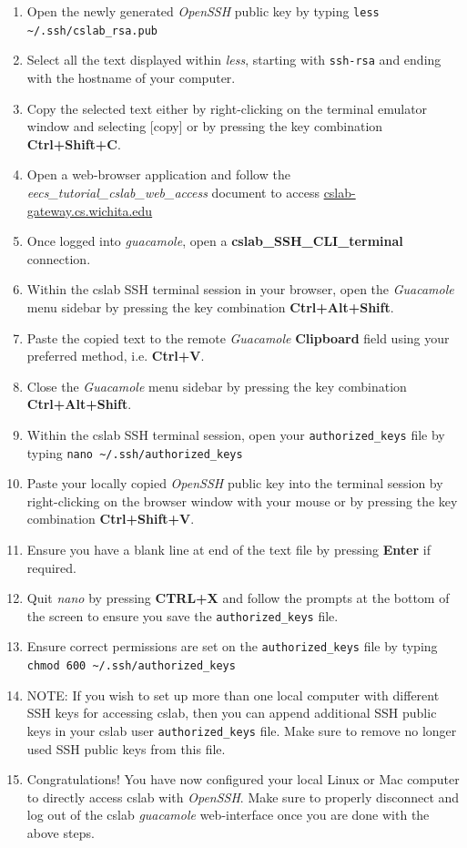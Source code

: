 \documentclass[12pt]{article}
\begin{document}
\begin{flushleft}
\begin{enumerate}
  \item Open the newly generated \textit{OpenSSH} public key by typing \break
    \verb|less ~/.ssh/cslab_rsa.pub|
  \item Select all the text displayed within \textit{less}, starting with \texttt{ssh-rsa} and ending with the hostname of your computer.
  \item Copy the selected text either by right-clicking on the terminal emulator window and selecting [copy] or by pressing the key combination \textbf{Ctrl+Shift+C}.
  \item Open a web-browser application and follow the \textit{eecs\_tutorial\_cslab\_web\_access} document to access \href{https://cslab-gateway.cs.wichita.edu/}{cslab-gateway.cs.wichita.edu}
  \item Once logged into \textit{guacamole}, open a \textbf{cslab\_SSH\_CLI\_terminal} connection.
  \item Within the cslab SSH terminal session in your browser, open the \textit{Guacamole} menu sidebar by pressing the key combination \textbf{Ctrl+Alt+Shift}.
  \item Paste the copied text to the remote \textit{Guacamole} \textbf{Clipboard} field using your preferred method, i.e. \textbf{Ctrl+V}.
  \item Close the \textit{Guacamole} menu sidebar by pressing the key combination \textbf{Ctrl+Alt+Shift}.
  \item Within the cslab SSH terminal session, open your \texttt{authorized\_keys} file by typing \break
  \verb|nano ~/.ssh/authorized_keys|
  \item Paste your locally copied \textit{OpenSSH} public key into the terminal session by right-clicking on the browser window with your mouse or by pressing the key combination \textbf{Ctrl+Shift+V}.
  \item Ensure you have a blank line at end of the text file by pressing \textbf{Enter} if required.
  \item Quit \textit{nano} by pressing \textbf{CTRL+X} and follow the prompts at the bottom of the screen to ensure you save the \verb|authorized_keys| file.
  \item Ensure correct permissions are set on the \verb|authorized_keys| file by typing \break
    \verb|chmod 600 ~/.ssh/authorized_keys|
  \item NOTE: If you wish to set up more than one local computer with different SSH keys for accessing cslab, then you can append additional SSH public keys in your cslab user \verb|authorized_keys| file. Make sure to remove no longer used SSH public keys from this file.
  \item Congratulations! You have now configured your local Linux or Mac computer to directly access cslab with \textit{OpenSSH}. Make sure to properly disconnect and log out of the cslab \textit{guacamole} web-interface once you are done with the above steps.
\end{enumerate}


\end{flushleft}
\end{document}
